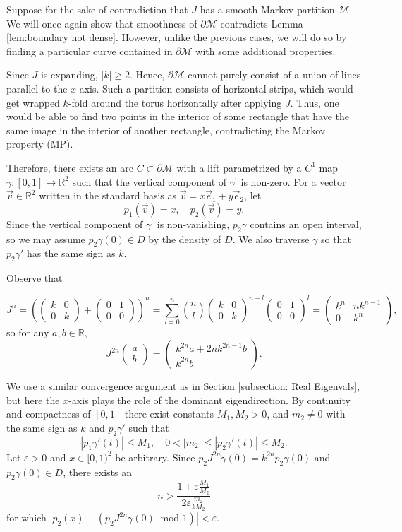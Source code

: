 \documentclass{article}
\def\R{\mathbb{R}}
\def\M{\mathcal{M}}
\newcommand{\brac}[1]{\left({#1}\right)}
\newcommand{\abs}[1]{\left\vert{#1}\right\vert}
\newcommand{\mtr}[1]{\begin{pmatrix} #1 \end{pmatrix}}
\begin{document}
Suppose for the sake of contradiction that $J$ has a smooth Markov partition $\M$. We will once again show that smoothness of $\partial\M$ contradicts Lemma \ref{lem:boundary not dense}. However, unlike the previous cases, we will do so by finding a particular curve contained in $\partial \M$ with some additional properties.

Since $J$ is expanding, $\abs{k} \ge 2$. Hence, $\partial \M$ cannot purely consist of a union of lines parallel to the $x$-axis. Such a partition consists of horizontal strips, which would get wrapped $k$-fold around the torus horizontally after applying $J$. Thus, one would be able to find two points in the interior of some rectangle that have the same image in the interior of another rectangle, contradicting the Markov property (MP).


Therefore, there exists an arc $C \subset \partial\M$ with a lift parametrized by a $C^1$ map $\gamma:[0,1] \to \R^2$ such that the vertical component of $\gamma^\prime$ is non-zero. For a vector $\vec{v}\in \R^2$ written in the standard basis as $\vec{v}=x\vec e_1+y\vec e_2 $, let $$p_1(\vec{v})=x,\quad p_2(\vec{v})=y.$$ Since the vertical component of $\gamma^\prime$ is non-vanishing, $p_2 \gamma$ contains an open interval, so we may assume $p_2\gamma(0) \in D$ by the density of $D$. We also traverse $\gamma$ so that $p_2\gamma'$ has the same sign as $k$. 

Observe that

$$
    J^n = \brac{\mtr{k & 0 \\ 0 & k} + \mtr{0 & 1 \\ 0 & 0}}^n = \sum_{l=0}^n {n \choose l} \mtr{k & 0 \\ 0 & k}^{n-l} \mtr{0 & 1 \\ 0 & 0}^l = \mtr{k^n & nk^{n-1} \\ 0 & k^n},
$$
so for any $a,b\in \R$, $$J^{2n}\begin{pmatrix} a \\ b \end{pmatrix} = \begin{pmatrix}
    k^{2n}a+2nk^{2n-1}b \\
    k^{2n}b
\end{pmatrix}.$$ 

We use a similar convergence argument as in Section \ref{subsection: Real Eigenvals}, but here the $x$-axis plays the role of the dominant eigendirection. By continuity and compactness of $[0,1]$ there exist constants $M_1,M_2>0$, and $m_2\neq 0$ with the same sign as $k$ and $p_2\gamma'$ such that $$|p_1\gamma'(t)|\leq M_1, \quad 0< |m_2|\leq |p_2\gamma'(t)|\leq M_2.$$ Let $\varepsilon>0$ and $x\in[0,1)^2$ be arbitrary. Since $p_2J^{2n}\gamma(0)=k^{2n}p_2\gamma(0)$ and $p_2\gamma(0)\in D$, there exists an $$n>\frac{1+\varepsilon\frac{M_1}{M_2}}{2\varepsilon\frac{m_2}{kM_2}}$$ for which $|p_2(x)-(p_2J^{2n}\gamma(0)\ \text{ mod } 1)|<\varepsilon.$
\end{document}
